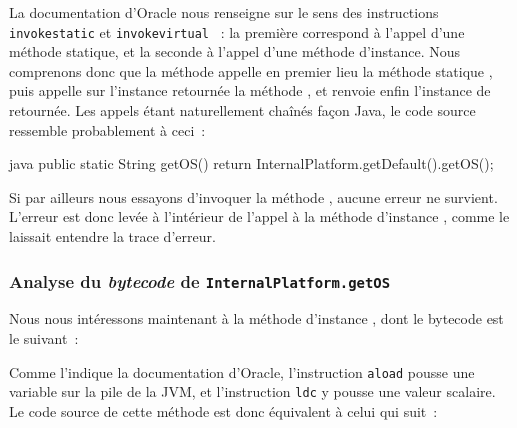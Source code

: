 La documentation d'Oracle nous renseigne sur le sens des instructions \texttt{invokestatic} \cite{javainvokestatic} et \texttt{invokevirtual} \cite{javainvokevirtual}~: %
la première correspond à l'appel d'une méthode statique, et la seconde à l'appel d'une méthode d'instance.
Nous comprenons donc que la méthode  appelle en premier lieu la méthode statique , %
puis appelle sur l'instance retournée la méthode , et renvoie enfin l'instance de  retournée.
Les appels étant naturellement chaînés façon Java, le code source ressemble probablement à ceci~:

\begin{imtaCode}{java}
public static String getOS() {
    return InternalPlatform.getDefault().getOS();
}
\end{imtaCode}

Si par ailleurs nous essayons d'invoquer la méthode , aucune erreur ne survient.
L'erreur est donc levée à l'intérieur de l'appel à la méthode d'instance , comme le laissait entendre la trace d'erreur.


\subsubsection{Analyse du \textit{bytecode} de \texttt{InternalPlatform.getOS}}

Nous nous intéressons maintenant à la méthode d'instance , dont le bytecode est le suivant~:


Comme l'indique la documentation d'Oracle, l'instruction \texttt{aload} \cite{javaaload} pousse une variable sur la pile de la JVM, et l'instruction %
\texttt{ldc} \cite{javaldc} y pousse une valeur scalaire.
Le code source de cette méthode est donc équivalent à celui qui suit~:


